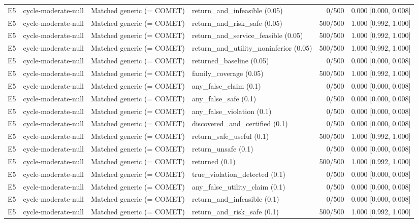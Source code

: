 \begin{longtable}{p{.04\linewidth}p{.18\linewidth}p{.19\linewidth}p{.16\linewidth}r p{.21\linewidth}}
E5 & cycle-moderate-null & Matched generic (= COMET) & return\_and\_infeasible (0.05) & 0/500 & 0.000 [0.000, 0.008]\\
E5 & cycle-moderate-null & Matched generic (= COMET) & return\_and\_risk\_safe (0.05) & 500/500 & 1.000 [0.992, 1.000]\\
E5 & cycle-moderate-null & Matched generic (= COMET) & return\_and\_service\_feasible (0.05) & 500/500 & 1.000 [0.992, 1.000]\\
E5 & cycle-moderate-null & Matched generic (= COMET) & return\_and\_utility\_noninferior (0.05) & 500/500 & 1.000 [0.992, 1.000]\\
E5 & cycle-moderate-null & Matched generic (= COMET) & returned\_baseline (0.05) & 0/500 & 0.000 [0.000, 0.008]\\
E5 & cycle-moderate-null & Matched generic (= COMET) & family\_coverage (0.05) & 500/500 & 1.000 [0.992, 1.000]\\
E5 & cycle-moderate-null & Matched generic (= COMET) & any\_false\_claim (0.1) & 0/500 & 0.000 [0.000, 0.008]\\
E5 & cycle-moderate-null & Matched generic (= COMET) & any\_false\_safe (0.1) & 0/500 & 0.000 [0.000, 0.008]\\
E5 & cycle-moderate-null & Matched generic (= COMET) & any\_false\_violation (0.1) & 0/500 & 0.000 [0.000, 0.008]\\
E5 & cycle-moderate-null & Matched generic (= COMET) & discovered\_and\_certified (0.1) & 0/500 & 0.000 [0.000, 0.008]\\
E5 & cycle-moderate-null & Matched generic (= COMET) & return\_safe\_useful (0.1) & 500/500 & 1.000 [0.992, 1.000]\\
E5 & cycle-moderate-null & Matched generic (= COMET) & return\_unsafe (0.1) & 0/500 & 0.000 [0.000, 0.008]\\
E5 & cycle-moderate-null & Matched generic (= COMET) & returned (0.1) & 500/500 & 1.000 [0.992, 1.000]\\
E5 & cycle-moderate-null & Matched generic (= COMET) & true\_violation\_detected (0.1) & 0/500 & 0.000 [0.000, 0.008]\\
E5 & cycle-moderate-null & Matched generic (= COMET) & any\_false\_utility\_claim (0.1) & 0/500 & 0.000 [0.000, 0.008]\\
E5 & cycle-moderate-null & Matched generic (= COMET) & return\_and\_infeasible (0.1) & 0/500 & 0.000 [0.000, 0.008]\\
E5 & cycle-moderate-null & Matched generic (= COMET) & return\_and\_risk\_safe (0.1) & 500/500 & 1.000 [0.992, 1.000]\\

\end{longtable}
